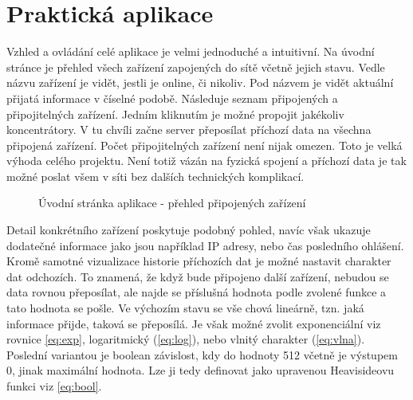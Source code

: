 \chapter{Praktická aplikace}
Vzhled a ovládání celé aplikace je velmi jednoduché a intuitivní. Na úvodní stránce je přehled všech zařízení zapojených do sítě včetně jejich stavu. Vedle názvu zařízení je vidět, jestli je online, či nikoliv. Pod názvem je vidět aktuální přijatá informace v číselné podobě. Následuje seznam připojených a připojitelných zařízení. Jedním kliknutím je možné propojit jakékoliv koncentrátory. V tu chvíli začne server přeposílat příchozí data na všechna připojená zařízení. Počet připojitelných zařízení není nijak omezen. Toto je velká výhoda celého projektu. Není totiž vázán na fyzická spojení a příchozí data je tak možné poslat všem v síti bez dalších technických komplikací.

\begin{figure}[h]
    \centering
	\caption{Úvodní stránka aplikace - přehled připojených zařízení}
	\label{fig:speedy1}
\end{figure}

Detail konkrétního zařízení poskytuje podobný pohled, navíc však ukazuje dodatečné informace jako jsou například IP adresy, nebo čas posledního ohlášení. Kromě samotné vizualizace historie příchozích dat je možné nastavit charakter dat odchozích. To znamená, že když bude připojeno další zařízení, nebudou se data rovnou přeposílat, ale najde se příslušná hodnota podle zvolené funkce a tato hodnota se pošle. Ve výchozím stavu se vše chová lineárně, tzn. jaká informace přijde, taková se přeposílá. Je však možné zvolit exponenciální viz rovnice \ref{eq:exp}, logaritmický (\ref{eq:log}), nebo vlnitý charakter (\ref{eq:vlna}). Poslední variantou je boolean závislost, kdy do hodnoty 512 včetně je výstupem 0, jinak maximální hodnota. Lze ji tedy definovat jako upravenou Heavisideovu funkci viz \ref{eq:bool}.

